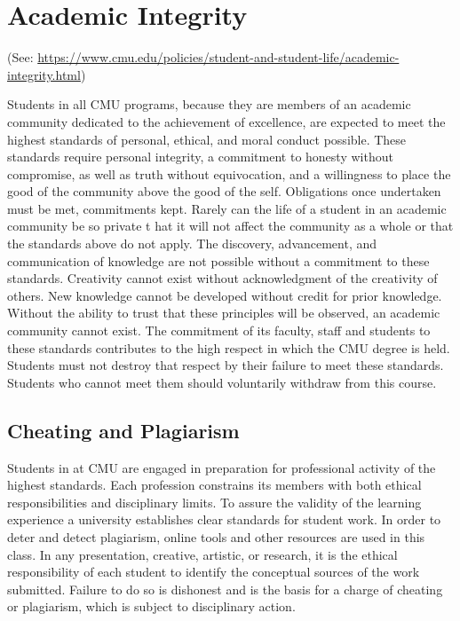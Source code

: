 \section{Academic Integrity}
\label{sec:cheating}

(See: {\footnotesize\url{https://www.cmu.edu/policies/student-and-student-life/academic-integrity.html}})

Students in all CMU programs, 
because they are members of an academic community dedicated to the achievement of excellence, 
are expected to meet the highest standards of personal, ethical, and moral conduct possible.
These standards require personal integrity, 
a commitment to honesty without compromise, 
as well as truth without equivocation, 
and a willingness to place the good of the community above the good of the self. 
Obligations once undertaken must be met, commitments kept.
Rarely can the life of a student in an academic community be so private t
hat it will not affect the community as a whole or that the standards above do not apply.
The discovery, advancement, and communication of knowledge 
are not possible without a commitment to these standards. 
Creativity cannot exist without acknowledgment of the creativity of others. 
New knowledge cannot be developed without credit for prior knowledge. 
Without the ability to trust that these principles will be observed, an academic community cannot exist.
The commitment of its faculty, staff and students to these standards contributes to the high respect in which the CMU degree is held. 
Students must not destroy that respect by their failure to meet these standards. 
Students who cannot meet them should voluntarily withdraw from this course.

\subsection{Cheating and Plagiarism}
Students in at CMU are engaged in preparation for professional activity of the highest standards. 
Each profession constrains its members with both ethical responsibilities and disciplinary limits. 
To assure the validity of the learning experience a university establishes clear standards for student work. 
In order to deter and detect plagiarism, online tools and other resources are used in this class.
In any presentation, creative, artistic, or research, 
it is the ethical responsibility of each student to identify the conceptual sources of the work submitted. 
Failure to do so is dishonest and is the basis for a charge of cheating or plagiarism, 
which is subject to disciplinary action.

